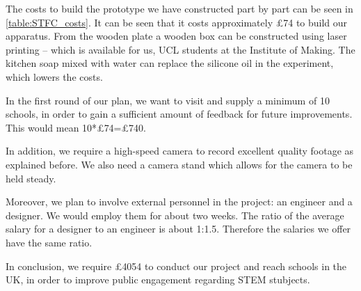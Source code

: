 The costs to build the prototype we have constructed part by part can be seen in \ref{table:STFC_costs}. It can be seen that it costs approximately {\pounds}74 to build our apparatus. From the wooden plate a wooden box can be constructed using laser printing -- which is available for us, UCL students at the Institute of Making. The kitchen soap mixed with water can replace the silicone oil in the experiment, which lowers the costs. 

In the first round of our plan, we want to visit and supply a minimum of 10 schools, in order to gain a sufficient amount of feedback for future improvements. This would mean 10*{\pounds}74={\pounds}740.

In addition, we require a high-speed camera to record excellent quality footage as explained before. We also need a camera stand which allows for the camera to be held steady.

Moreover, we plan to involve external personnel in the project: an engineer and a designer. We would employ them for about two weeks. The ratio of the average salary for a designer to an engineer is about 1:1.5. Therefore the salaries we offer have the same ratio.

In conclusion, we require {\pounds}4054 to conduct our project and reach schools in the UK, in order to improve public engagement regarding STEM stubjects.